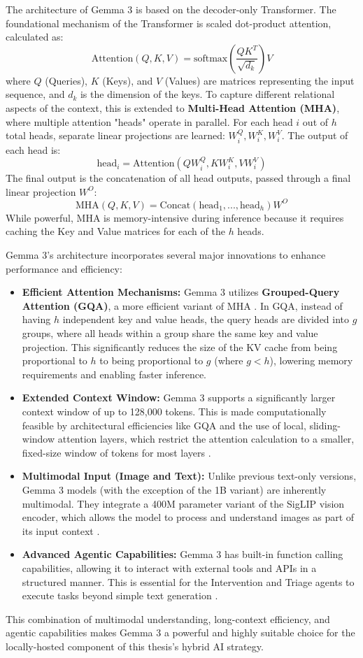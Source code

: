 The architecture of Gemma 3 is based on the decoder-only Transformer. The foundational mechanism of the Transformer is scaled dot-product attention, calculated as:
$$ \text{Attention}(Q, K, V) = \text{softmax}\left(\frac{QK^T}{\sqrt{d_k}}\right)V $$
where $Q$ (Queries), $K$ (Keys), and $V$ (Values) are matrices representing the input sequence, and $d_k$ is the dimension of the keys. To capture different relational aspects of the context, this is extended to \textbf{Multi-Head Attention (MHA)}, where multiple attention "heads" operate in parallel. For each head $i$ out of $h$ total heads, separate linear projections are learned: $W_i^Q, W_i^K, W_i^V$. The output of each head is:
$$ \text{head}_i = \text{Attention}(QW_i^Q, KW_i^K, VW_i^V) $$
The final output is the concatenation of all head outputs, passed through a final linear projection $W^O$:
$$ \text{MHA}(Q, K, V) = \text{Concat}(\text{head}_1, ..., \text{head}_h)W^O $$
While powerful, MHA is memory-intensive during inference because it requires caching the Key and Value matrices for each of the $h$ heads.

Gemma 3's architecture incorporates several major innovations to enhance performance and efficiency:
\begin{itemize}
    \item \textbf{Efficient Attention Mechanisms:} Gemma 3 utilizes \textbf{Grouped-Query Attention (GQA)}, a more efficient variant of MHA \cite{FIND_CITATION_PLEASE}. In GQA, instead of having $h$ independent key and value heads, the query heads are divided into $g$ groups, where all heads within a group share the same key and value projection. This significantly reduces the size of the KV cache from being proportional to $h$ to being proportional to $g$ (where $g < h$), lowering memory requirements and enabling faster inference.
    \item \textbf{Extended Context Window:} Gemma 3 supports a significantly larger context window of up to 128,000 tokens. This is made computationally feasible by architectural efficiencies like GQA and the use of local, sliding-window attention layers, which restrict the attention calculation to a smaller, fixed-size window of tokens for most layers \cite{FIND_CITATION_PLEASE}.
    \item \textbf{Multimodal Input (Image and Text):} Unlike previous text-only versions, Gemma 3 models (with the exception of the 1B variant) are inherently multimodal. They integrate a 400M parameter variant of the SigLIP vision encoder, which allows the model to process and understand images as part of its input context \cite{FIND_CITATION_PLEASE}.
    \item \textbf{Advanced Agentic Capabilities:} Gemma 3 has built-in function calling capabilities, allowing it to interact with external tools and APIs in a structured manner. This is essential for the Intervention and Triage agents to execute tasks beyond simple text generation \cite{FIND_CITATION_PLEASE}.
\end{itemize}
This combination of multimodal understanding, long-context efficiency, and agentic capabilities makes Gemma 3 a powerful and highly suitable choice for the locally-hosted component of this thesis's hybrid AI strategy.

